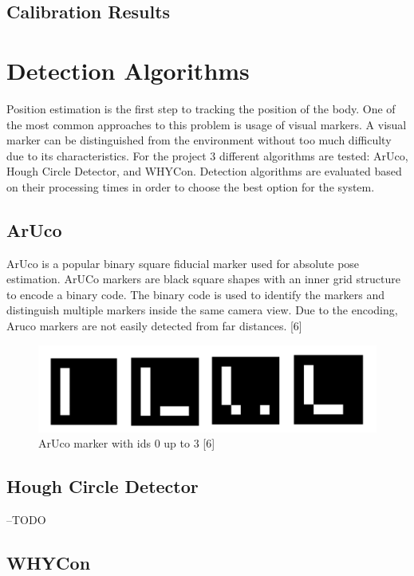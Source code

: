 \subsection{Calibration Results}




\section{Detection Algorithms}

Position estimation is the first step to tracking the position
of the body. One of the most common approaches to this problem
is usage of visual markers. A visual marker can be distinguished
from the environment without too much difficulty due to its
characteristics. For the project 3 different algorithms are tested:
ArUco, Hough Circle Detector, and WHYCon. Detection algorithms
are evaluated based on their processing times in order to choose
the best option for the system.

\subsection{ArUco}

ArUco is a popular binary square fiducial marker used for
absolute pose estimation.  ArUCo markers are black square
shapes with an inner grid structure to encode a binary code.
The binary code is used to identify the markers and distinguish
multiple markers inside the same camera view. Due to the encoding,
Aruco markers are not easily detected from far distances. [6]

\begin{figure}[!htb]\centering
    \includegraphics*[width = 16cm]{bilder/project/aruco_marker.png}
    \caption{ArUco marker with ids 0 up to 3 [6]}
    \label{fig:aruco marker}
\end{figure}


\subsection{Hough Circle Detector}
--TODO


\subsection{WHYCon}

